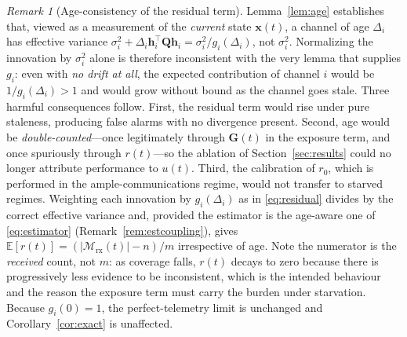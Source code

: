 \documentclass[journal]{IEEEtran}
\theoremstyle{plain}
\theoremstyle{definition}
\theoremstyle{remark}
\newtheorem{remark}{Remark}
\newcommand{\bx}{\mathbf{x}}
\newcommand{\bh}{\mathbf{h}}
\newcommand{\bG}{\mathbf{G}}
\newcommand{\Mrx}{\mathcal{M}_{\mathrm{rx}}}
\newcommand{\bQ}{\mathbf{Q}}
\begin{document}
\begin{remark}[Age-consistency of the residual term]
\label{rem:ageconsistent}
Lemma~\ref{lem:age} establishes that, viewed as a measurement of the
\emph{current} state $\bx(t)$, a channel of age $\Delta_i$ has effective
variance $\sigma_i^{2}+\Delta_i\bh_i^{\top}\bQ\bh_i=\sigma_i^{2}/g_i(\Delta_i)$,
not $\sigma_i^{2}$. Normalizing the innovation by $\sigma_i^{2}$ alone is
therefore inconsistent with the very lemma that supplies $g_i$: even with
\emph{no drift at all}, the expected contribution of channel $i$ would be
$1/g_i(\Delta_i)>1$ and would grow without bound as the channel goes
stale. Three harmful consequences follow. First, the residual term would
rise under pure staleness, producing false alarms with no divergence
present. Second, age would be \emph{double-counted}---once legitimately
through $\bG(t)$ in the exposure term, and once spuriously through
$r(t)$---so the ablation of Section~\ref{sec:results} could no longer
attribute performance to $u(t)$. Third, the calibration of $r_0$, which is
performed in the ample-communications regime, would not transfer to
starved regimes. Weighting each innovation by $g_i(\Delta_i)$ as in
\eqref{eq:residual} divides by the correct effective variance and, provided
the estimator is the age-aware one of \eqref{eq:estimator}
(Remark~\ref{rem:estcoupling}), gives
$\mathbb{E}[r(t)]=(|\Mrx(t)|-n)/m$ irrespective of age. Note the numerator
is the \emph{received} count, not $m$: as coverage falls, $r(t)$ decays to
zero because there is progressively less evidence to be inconsistent,
which is the intended behaviour and the reason the exposure term must
carry the burden under starvation. Because
$g_i(0)=1$, the perfect-telemetry limit is unchanged and
Corollary~\ref{cor:exact} is unaffected.
\end{remark}
\end{document}
